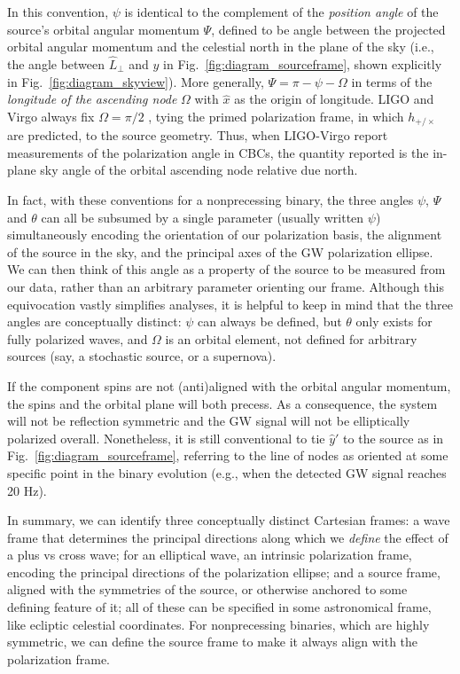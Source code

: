 \documentclass[aps,prd,twocolumn,superscriptaddress,preprintnumbers,floatfix,nofootinbib]{revtex4-2}
\begin{document}
In this convention, $\psi$ is identical to the complement of the \emph{position angle} of the source's orbital angular momentum $\Psi$, defined to be angle between the projected orbital angular momentum and the celestial north in the plane of the sky (i.e., the angle between $\hat{L}_\perp$ and $\hat{y}$ in Fig.~\ref{fig:diagram_sourceframe}, shown explicitly in Fig.~\ref{fig:diagram_skyview}).
More generally, $\Psi = \pi - \psi - \Omega$ in terms of the \emph{longitude of the ascending node} $\Omega$ with $\hat{x}$ as the origin of longitude.
LIGO and Virgo always fix $\Omega = \pi/2$ \cite{LALSuite:source}, tying the primed polarization frame, in which $h_{+/\times}$ are predicted, to the source geometry.
Thus, when LIGO-Virgo report measurements of the polarization angle in CBCs, the quantity reported is the in-plane sky angle of the orbital ascending node relative due north.

In fact, with these conventions for a nonprecessing binary, the three angles $\psi$, $\Psi$ and $\theta$ can all be subsumed by a single parameter (usually written $\psi$) simultaneously encoding the orientation of our polarization basis, the alignment of the source in the sky, and the principal axes of the GW polarization ellipse.
We can then think of this angle as a property of the source to be measured from our data, rather than an arbitrary parameter orienting our frame.
Although this equivocation vastly simplifies analyses, it is helpful to keep in mind that the three angles are conceptually distinct: $\psi$ can always be defined, but $\theta$ only exists for fully polarized waves, and $\Omega$ is an orbital element, not defined for arbitrary sources (say, a stochastic source, or a supernova).

If the component spins are not (anti)aligned with the orbital angular momentum, the spins and the orbital plane will both precess.
As a consequence, the system will not be reflection symmetric and the GW signal will not be elliptically polarized overall.
Nonetheless, it is still conventional to tie $\hat{y}'$ to the source as in Fig.~\ref{fig:diagram_sourceframe}, referring to the line of nodes as oriented at some specific point in the binary evolution (e.g., when the detected GW signal reaches 20 Hz).

In summary, we can identify three conceptually distinct Cartesian frames: a wave frame that determines the principal directions along which we \emph{define} the effect of a plus vs cross wave; for an elliptical wave, an intrinsic polarization frame, encoding the principal directions of the polarization ellipse; and a source frame, aligned with the symmetries of the source, or otherwise anchored to some defining feature of it; all of these can be specified in some astronomical frame, like ecliptic celestial coordinates.
For nonprecessing binaries, which are highly symmetric, we can define the source frame to make it always align with the polarization frame.
\end{document}
